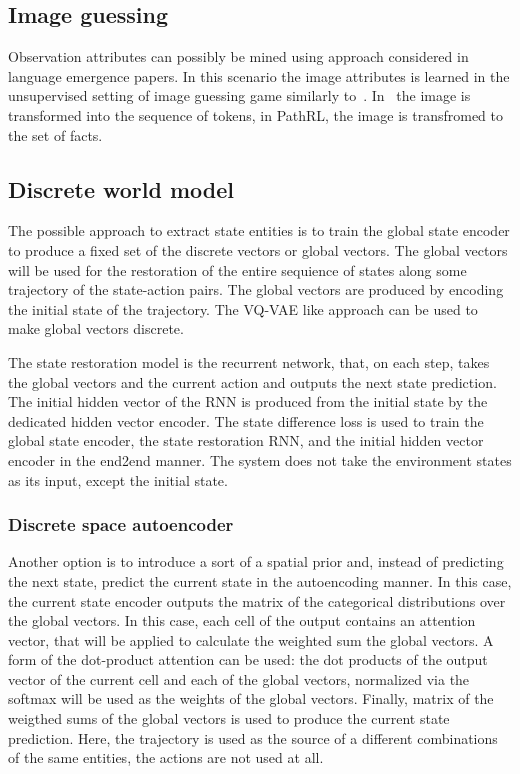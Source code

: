 \documentclass[acmsmall, nonacm]{acmart}
\begin{document}
\subsection{Image guessing}

Observation attributes can possibly be mined using approach considered in language emergence papers. In this scenario the image attributes is learned in the unsupervised setting of image guessing game similarly to~\citet{Havrylov2017EmergenceOL}. In~\citet{Havrylov2017EmergenceOL} the image is transformed into the sequence of tokens, in PathRL, the image is transfromed to the set of facts.

\subsection{Discrete world model}

The possible approach to extract state entities is to train the global state encoder to produce a fixed set of the discrete vectors or global vectors. The global vectors will be used for the restoration of the entire sequience of states along some trajectory of the state-action pairs. The global vectors are produced by encoding the initial state of the trajectory. The VQ-VAE like approach can be used to make global vectors discrete.

The state restoration model is the recurrent network, that, on each step, takes the global vectors and the current action and outputs the next state prediction. The initial hidden vector of the RNN is produced from the initial state by the dedicated hidden vector encoder. The state difference loss is used to train the global state encoder, the state restoration RNN, and the initial hidden vector encoder in the end2end manner. The system does not take the environment states as its input, except the initial state.

\subsubsection{Discrete space autoencoder}

Another option is to introduce a sort of a spatial prior and, instead of predicting the next state, predict the current state in the autoencoding manner. In this case, the current state encoder outputs the matrix of the categorical distributions over the global vectors. In this case, each cell of the output contains an attention vector, that will be applied to calculate the weighted sum the global vectors. A form of the dot-product attention can be used: the dot products of the output vector of the current cell and each of the global vectors, normalized via the softmax will be used as the weights of the global vectors. Finally, matrix of the weigthed sums of the global vectors is used to produce the current state prediction. Here, the trajectory is used as the source of a different combinations of the same entities, the actions are not used at all.
\end{document}
